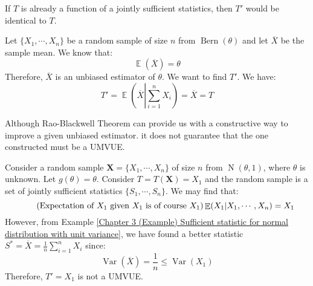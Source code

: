 \documentclass{huhtakm-template-book-v2}
\DeclareMathOperator{\E}{\mathbb{E}}
\DeclareMathOperator{\Var}{Var}
\DeclareMathOperator{\Bern}{Bern}
\DeclareMathOperator{\N}{N}
\begin{document}
\newpage
\begin{rem}
	If $T$ is already a function of a jointly sufficient statistics, then $T'$ would be identical to $T$.
\end{rem}
\begin{eg}
	Let $\{X_{1},\cdots,X_{n}\}$ be a random sample of size $n$ from $\Bern(\theta)$ and let $\overline{X}$ be the sample mean. We know that:
	\begin{equation*}
		\E(\overline{X})=\theta
	\end{equation*}
	Therefore, $\overline{X}$ is an unbiased estimator of $\theta$. We want to find $T'$. We have:
	\begin{equation*}
		T'=\E\left(\overline{X}\left|\sum_{i=1}^{n}X_{i}\right.\right)=\overline{X}=T
	\end{equation*}
\end{eg}
\begin{rem}
	Although Rao-Blackwell Theorem can provide us with a constructive way to improve a given unbiased estimator. it does not guarantee that the one constructed must be a UMVUE.
\end{rem}
\begin{eg}
	Consider a random sample $\mathbf{X}=\{X_{1},\cdots,X_{n}\}$ of size $n$ from $\N(\theta,1)$, where $\theta$ is unknown. Let $g(\theta)=\theta$. Consider $T=T(\mathbf{X})=X_{1}$ and the random sample is a set of jointly sufficient statistics $\{S_{1},\cdots,S_{n}\}$. We may find that:
	\begin{equation*}
		\tag{Expectation of $X_{1}$ given $X_{1}$ is of course $X_{1}$}
		\E(X_{1}|X_{1},\cdots,X_{n})=X_{1}
	\end{equation*}
	However, from Example \ref{Chapter 3 (Example) Sufficient statistic for normal distribution with unit variance}, we have found a better statistic $S^{*}=\overline{X}=\frac{1}{n}\sum_{i=1}^{n}X_{i}$ since:
	\begin{equation*}
		\Var(\overline{X})=\frac{1}{n}\leq\Var(X_{1})
	\end{equation*}
	Therefore, $T'=X_{1}$ is not a UMVUE.
\end{eg}
\end{document}
